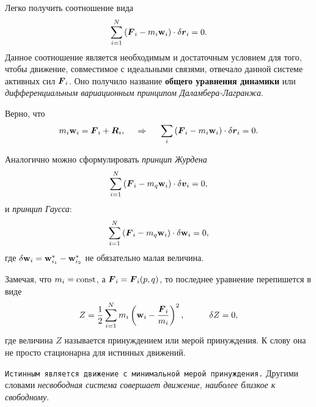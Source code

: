 
Легко получить соотношение вида
\begin{equation}
    \sum_{i=1}^N \left(
        \mbox{\boldmath $F$}_i - m_i \mbox{\boldmath $\mathrm{w}$}_i
    \right) \cdot \delta \mbox{\boldmath $r$}_i = 0.
\end{equation}
Данное соотношение является необходимым и достаточным условием для того, чтобы движение, совместимое с идеальными связями, отвечало данной системе активных сил $\mbox{\boldmath $F$}_i$. Оно получило название \textbf{общего уравнения динамики} или \textit{дифференциальным вариационным принципом Даламбера-Лагранжа}.

\begin{to_thr} 
Верно, что
\begin{equation*}
    m_i \mbox{\boldmath $\mathrm{w}$}_i = \mbox{\boldmath $F$}_i + \mbox{\boldmath $R$}_i,
    \hspace{0.5cm} \Rightarrow \hspace{0.5cm} 
    \sum_i \left(
       \mbox{\boldmath $F$}_i -  m_i \mbox{\boldmath $\mathrm{w}$}_i
    \right) \cdot \delta \mbox{\boldmath $r$}_i = 0.
\end{equation*}
\end{to_thr}

Аналогично можно сформулировать \textit{принцип Журдена}
\begin{equation}
    \sum_{i=1}^N \left(
        \mbox{\boldmath $F$}_i - m_q \mbox{\boldmath $\mathrm{w}$}_i
    \right) \cdot \delta  \mbox{\boldmath $v$}_i = 0,
\end{equation}
и \textit{принцип Гаусса}:
\begin{equation}
    \sum_{i=1}^N \left(
        \mbox{\boldmath $F$}_i - m_q \mbox{\boldmath $\mathrm{w}$}_i
    \right) \cdot \delta \mbox{\boldmath $\mathrm{w}$}_i = 0,
\end{equation}
где $\delta \mbox{\boldmath $\mathrm{w}$}_i = \mbox{\boldmath $\mathrm{w}$}^*_{i_1} - \mbox{\boldmath $\mathrm{w}$}^*_{i_2}$ не обязательно малая величина. 

Замечая, что $m_i = \text{const}$, а $\mbox{\boldmath $F$}_i = \mbox{\boldmath $F$}_i (p, q)$, то последнее уравнение перепишется в виде
\begin{equation*}
    Z = \frac{1}{2} \sum_{i=1}^N m_i 
    \left(
        \mbox{\boldmath $\mathrm{w}$}_i - \frac{\mbox{\boldmath $F$}_i}{m_i} 
    \right)^2,
    \hspace{1cm} 
    \delta Z = 0,
\end{equation*}
где величина $Z$ называется принуждением или мерой принуждения. К слову она не просто стационарна для истинных движений. 

\texttt{Истинным является движение с минимальной мерой принуждения.} Другими словами \textit{несвободная система совершает движение, наиболее близкое к свободному}. 

